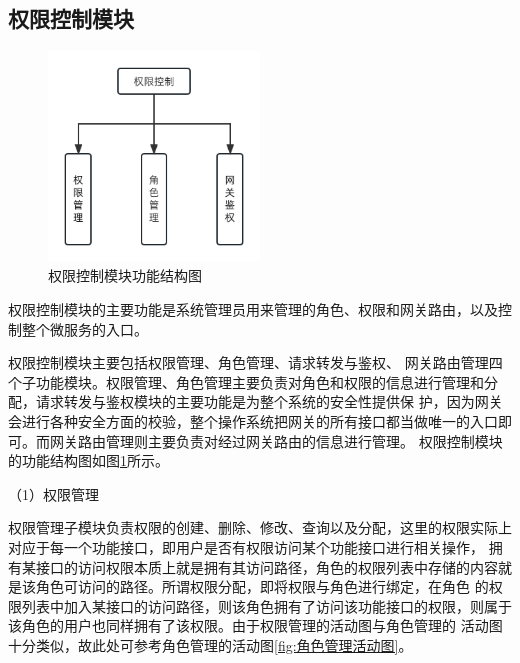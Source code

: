 
\subsection{权限控制模块}

\begin{figure}[h]
    \centering
    \includegraphics[width=0.5\textwidth]{my_figures/chapter4/权限控制模块功能结构图.png}
    \caption{权限控制模块功能结构图}
    \label{fig:权限控制模块功能结构图}
\end{figure}

权限控制模块的主要功能是系统管理员用来管理的角色、权限和网关路由，以及控制整个微服务的入口。

权限控制模块主要包括权限管理、角色管理、请求转发与鉴权、
网关路由管理四个子功能模块。权限管理、角色管理主要负责对角色和权限的信息进行管理和分配，请求转发与鉴权模块的主要功能是为整个系统的安全性提供保
护，因为网关会进行各种安全方面的校验，整个操作系统把网关的所有接口都当做唯一的入口即可。而网关路由管理则主要负责对经过网关路由的信息进行管理。
权限控制模块的功能结构图如图\ref{fig:权限控制模块功能结构图}所示。




（1）权限管理

权限管理子模块负责权限的创建、删除、修改、查询以及分配，这里的权限实际上对应于每一个功能接口，即用户是否有权限访问某个功能接口进行相关操作，
拥有某接口的访问权限本质上就是拥有其访问路径，角色的权限列表中存储的内容就是该角色可访问的路径。所谓权限分配，即将权限与角色进行绑定，在角色
的权限列表中加入某接口的访问路径，则该角色拥有了访问该功能接口的权限，则属于该角色的用户也同样拥有了该权限。由于权限管理的活动图与角色管理的
活动图十分类似，故此处可参考角色管理的活动图\ref{fig:角色管理活动图}。

